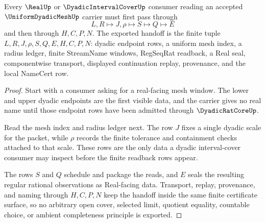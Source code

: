 \begin{theorem}
\label{thm:uniform-dyadic-mesh-real-window-handoff}
Every $\RealUp$ or $\DyadicIntervalCoverUp$ consumer reading an accepted $\UniformDyadicMeshUp$ carrier must first pass through
$$
L,R \longmapsto J,\rho \longmapsto S \longmapsto Q \longmapsto E
$$
and then through $H,C,P,N$. The exported handoff is the finite tuple $L,R,J,\rho,S,Q,E,H,C,P,N$: dyadic endpoint rows, a uniform mesh index, a radius ledger, finite StreamName windows, RegSeqRat readback, a Real seal, componentwise transport, displayed continuation replay, provenance, and the local NameCert row.
\end{theorem}
\begin{proof}
Start with a consumer asking for a real-facing mesh window. The lower and upper dyadic endpoints are the first visible data, and the carrier gives no real name until those endpoint rows have been admitted through $\DyadicRatCoreUp$.

Read the mesh index and radius ledger next. The row $J$ fixes a single dyadic scale for the packet, while $\rho$ records the finite tolerance and containment checks attached to that scale. These rows are the only data a dyadic interval-cover consumer may inspect before the finite readback rows appear.

The rows $S$ and $Q$ schedule and package the reads, and $E$ seals the resulting regular rational observations as Real-facing data. Transport, replay, provenance, and naming through $H,C,P,N$ keep the handoff inside the same finite certificate surface, so no arbitrary open cover, selected limit, quotient equality, countable choice, or ambient completeness principle is exported.
\end{proof}



